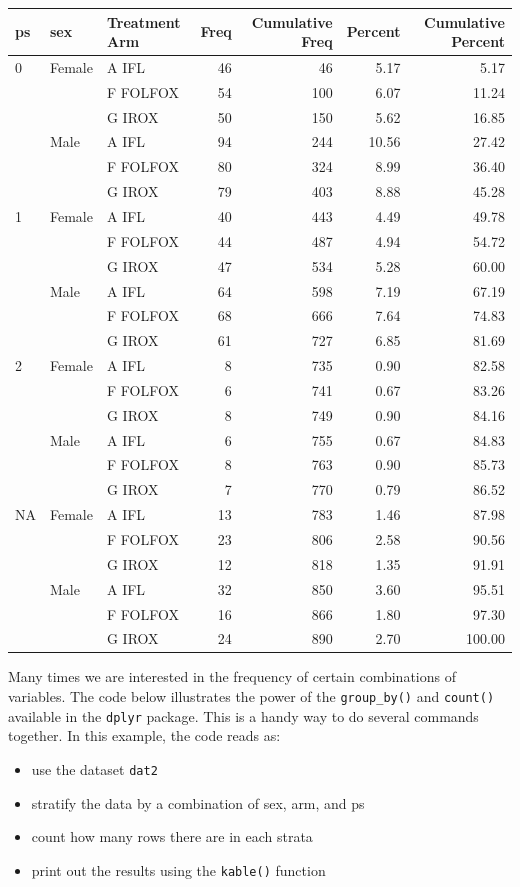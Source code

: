 \documentclass[
]{book}
\newenvironment{Shaded}{\begin{snugshade}}{\end{snugshade}}
\newcommand{\KeywordTok}[1]{\textcolor[rgb]{0.13,0.29,0.53}{\textbf{#1}}}
\newcommand{\NormalTok}[1]{#1}
\newcommand{\OperatorTok}[1]{\textcolor[rgb]{0.81,0.36,0.00}{\textbf{#1}}}
\newcommand{\StringTok}[1]{\textcolor[rgb]{0.31,0.60,0.02}{#1}}
\providecommand{\tightlist}{%
  \setlength{\itemsep}{0pt}\setlength{\parskip}{0pt}}
\begin{document}
\begin{longtable}[]{@{}lllrrrr@{}}
\toprule
ps & sex & Treatment Arm & Freq & Cumulative Freq & Percent & Cumulative Percent\tabularnewline
\midrule
\endhead
0 & Female & A IFL & 46 & 46 & 5.17 & 5.17\tabularnewline
& & F FOLFOX & 54 & 100 & 6.07 & 11.24\tabularnewline
& & G IROX & 50 & 150 & 5.62 & 16.85\tabularnewline
& Male & A IFL & 94 & 244 & 10.56 & 27.42\tabularnewline
& & F FOLFOX & 80 & 324 & 8.99 & 36.40\tabularnewline
& & G IROX & 79 & 403 & 8.88 & 45.28\tabularnewline
1 & Female & A IFL & 40 & 443 & 4.49 & 49.78\tabularnewline
& & F FOLFOX & 44 & 487 & 4.94 & 54.72\tabularnewline
& & G IROX & 47 & 534 & 5.28 & 60.00\tabularnewline
& Male & A IFL & 64 & 598 & 7.19 & 67.19\tabularnewline
& & F FOLFOX & 68 & 666 & 7.64 & 74.83\tabularnewline
& & G IROX & 61 & 727 & 6.85 & 81.69\tabularnewline
2 & Female & A IFL & 8 & 735 & 0.90 & 82.58\tabularnewline
& & F FOLFOX & 6 & 741 & 0.67 & 83.26\tabularnewline
& & G IROX & 8 & 749 & 0.90 & 84.16\tabularnewline
& Male & A IFL & 6 & 755 & 0.67 & 84.83\tabularnewline
& & F FOLFOX & 8 & 763 & 0.90 & 85.73\tabularnewline
& & G IROX & 7 & 770 & 0.79 & 86.52\tabularnewline
NA & Female & A IFL & 13 & 783 & 1.46 & 87.98\tabularnewline
& & F FOLFOX & 23 & 806 & 2.58 & 90.56\tabularnewline
& & G IROX & 12 & 818 & 1.35 & 91.91\tabularnewline
& Male & A IFL & 32 & 850 & 3.60 & 95.51\tabularnewline
& & F FOLFOX & 16 & 866 & 1.80 & 97.30\tabularnewline
& & G IROX & 24 & 890 & 2.70 & 100.00\tabularnewline
\bottomrule
\end{longtable}

Many times we are interested in the frequency of certain combinations of variables. The code below illustrates the power of the \texttt{group\_by()} and \texttt{count()} available in the \texttt{dplyr} package. This is a handy way to do several commands together. In this example, the code reads as:

\begin{itemize}
\tightlist
\item
  use the dataset \texttt{dat2}
\item
  stratify the data by a combination of sex, arm, and ps
\item
  count how many rows there are in each strata
\item
  print out the results using the \texttt{kable()} function
\end{itemize}

\begin{Shaded}
\end{Shaded}
\end{document}
